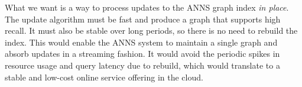 



What we want is a way to process updates to the ANNS graph index \emph{in place}.
The update algorithm must be fast and produce a graph that supports high recall.
It must also be stable over long periods, so there is no need to rebuild the index.
This would enable the ANNS system to maintain a single graph and absorb updates
in a streaming fashion. It would avoid the periodic spikes in resource usage and
query latency due to rebuild, which would translate to a stable and low-cost
online service offering in the cloud.

